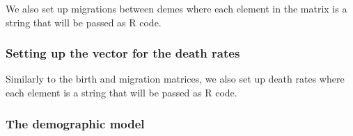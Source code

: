 \documentclass[12pt,]{article}
\newenvironment{Shaded}{\begin{snugshade}}{\end{snugshade}}
\newcommand{\NormalTok}[1]{#1}
\newcommand{\StringTok}[1]{\textcolor[rgb]{0.31,0.60,0.02}{#1}}
\begin{document}
We also set up migrations between demes where each element in the matrix
is a string that will be passed as R code.

\begin{Shaded}
\end{Shaded}

\hypertarget{setting-up-the-vector-for-the-death-rates}{%
\subsubsection{Setting up the vector for the death
rates}\label{setting-up-the-vector-for-the-death-rates}}

Similarly to the birth and migration matrices, we also set up death
rates where each element is a string that will be passed as R code.

\begin{Shaded}
\end{Shaded}

\hypertarget{the-demographic-model}{%
\subsubsection{The demographic model}\label{the-demographic-model}}
\end{document}
